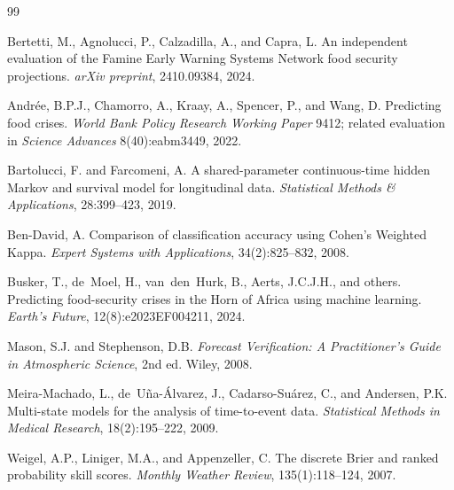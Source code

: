 \documentclass[11pt,letterpaper]{article}
\begin{document}

\begin{thebibliography}{99}

Bertetti, M., Agnolucci, P., Calzadilla, A., and Capra, L.
\newblock An independent evaluation of the Famine Early Warning Systems Network food security projections.
\newblock \textit{arXiv preprint}, 2410.09384, 2024.

Andr{\'e}e, B.P.J., Chamorro, A., Kraay, A., Spencer, P., and Wang, D.
\newblock Predicting food crises.
\newblock \textit{World Bank Policy Research Working Paper} 9412; related evaluation in \textit{Science Advances} 8(40):eabm3449, 2022.

Bartolucci, F. and Farcomeni, A.
\newblock A shared-parameter continuous-time hidden Markov and survival model for longitudinal data.
\newblock \textit{Statistical Methods \& Applications}, 28:399--423, 2019.

Ben-David, A.
\newblock Comparison of classification accuracy using Cohen's Weighted Kappa.
\newblock \textit{Expert Systems with Applications}, 34(2):825--832, 2008.

Busker, T., de~Moel, H., van~den~Hurk, B., Aerts, J.C.J.H., and others.
\newblock Predicting food-security crises in the Horn of Africa using machine learning.
\newblock \textit{Earth's Future}, 12(8):e2023EF004211, 2024.

Mason, S.J. and Stephenson, D.B.
\newblock \textit{Forecast Verification: A Practitioner's Guide in Atmospheric Science}, 2nd ed.
\newblock Wiley, 2008.

Meira-Machado, L., de~U{\~n}a-{\'A}lvarez, J., Cadarso-Su{\'a}rez, C., and Andersen, P.K.
\newblock Multi-state models for the analysis of time-to-event data.
\newblock \textit{Statistical Methods in Medical Research}, 18(2):195--222, 2009.

Weigel, A.P., Liniger, M.A., and Appenzeller, C.
\newblock The discrete Brier and ranked probability skill scores.
\newblock \textit{Monthly Weather Review}, 135(1):118--124, 2007.


\end{thebibliography}
\end{document}
